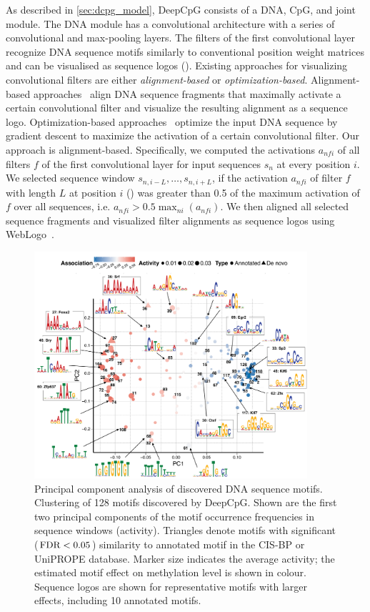 As described in \cref{sec:dcpg_model}, DeepCpG consists of a DNA, CpG, and joint module. The DNA module has a convolutional architecture with a series of convolutional and max-pooling layers. The filters of the first convolutional layer recognize DNA sequence motifs similarly to conventional position weight matrices and can be visualised as sequence logos (). Existing approaches for visualizing convolutional filters are either \emph{alignment-based} or \emph{optimization-based}. Alignment-based approaches~\citep{alipanahi_predicting_2015,kelley_basset:_2016,quang_danq:_2016} align DNA sequence fragments that maximally activate a certain convolutional filter and visualize the resulting alignment as a sequence logo. Optimization-based approaches~\citep{lanchantin_deep_2016,lanchantin_deep_2016-1} optimize the input DNA sequence by gradient descent to maximize the activation of a certain convolutional filter. Our approach is alignment-based. Specifically, we computed the activations $a_{nfi}$ of all filters $f$ of the first convolutional layer for input sequences $s_n$ at every position $i$. We selected sequence window $s_{n,i-L},\ldots,s_{n,i+L}$, if the activation $a_{nfi}$ of filter $f$ with length $L$ at position $i$ () was greater than 0.5 of the maximum activation of $f$ over all sequences, i.e. $a_{nfi}>0.5 \max_{ni}(a_{nfi})$. We then aligned all selected sequence fragments and visualized filter alignments as sequence logos using WebLogo~\citep{crooks_weblogo:_2004}.

\begin{figure}[htbp!]
\centering
\includegraphics[width=0.9\textwidth]{motifs_pca}
\caption[Principal component analysis of discovered DNA sequence motifs.]{Principal component analysis of discovered DNA sequence motifs. Clustering of 128 motifs discovered by DeepCpG. Shown are the first two principal components of the motif occurrence frequencies in sequence windows (activity). Triangles denote motifs with significant ($\operatorname{FDR}<0.05$) similarity to annotated motif in the CIS-BP or UniPROPE database. Marker size indicates the average activity; the estimated motif effect on methylation level is shown in colour. Sequence logos are shown for representative motifs with larger effects, including 10 annotated motifs.}
\label{fig:dcpg_motifs_pca}
\end{figure}


